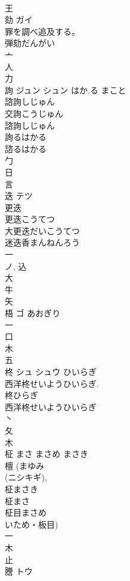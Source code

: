 \documentclass[8pt]{extreport}
\begin{document}
\begin{CJK}{UTF8}{min}
\\	王 
\\	劾	ガイ		
\\	罪を調べ追及する。 
\\	弾劾だんがい
\\	亠 
\\	人 
\\	力 
\\	詢	ジュン シュン	はか.る まこと	
\\	諮詢しじゅん
\\	交詢こうじゅん
\\	諮詢しじゅん
\\	詢るはかる 
\\	諮るはかる
\\	勹 
\\	日 
\\	言 
\\	迭	テツ		
\\	更迭 
\\	更迭こうてつ 
\\	大更迭だいこうてつ 
\\	迷迭香まんねんろう 
\\	一 
\\	ノ, 込 
\\	大 
\\	牛 
\\	矢 
\\	梧	ゴ	あおぎり	
\\	一 
\\	口 
\\	木 
\\	五 
\\	柊	シュ シュウ	ひいらぎ	
\\	西洋柊せいようひいらぎ.
\\	柊ひらぎ 
\\	西洋柊せいようひいらぎ 
\\	丶 
\\	夂 
\\	木 
\\	柾		まさ まさめ まさき	
\\	檀 (まゆみ 
\\	(ニシキギ), 
\\	柾まさき 
\\	柾まさ 
\\	柾目まさめ 
\\	いため・板目) 
\\	一 
\\	木 
\\	止 
\\	謄	トウ		

\end{CJK}
\end{document}

